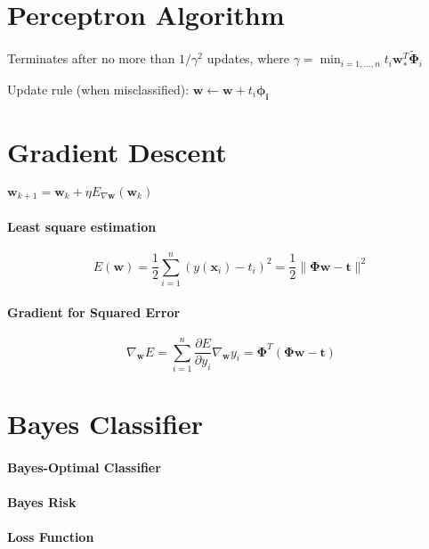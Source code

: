 \documentclass[9pt,fleqn]{scrartcl}
\begin{document}
\begin{multicols}{4}
\section{Perceptron Algorithm}
Terminates after no more than $1/\gamma^2$ updates, where 
$\gamma = \min_{i=1,\dots,n} t_i\mathbf{w}_*^T\mathbf{\tilde
\Phi}_i$

Update rule (when misclassified): $\mathbf{w} \leftarrow \mathbf{w} +
t_i\mathbf{\phi_i}$

\section{Gradient Descent}
$\mathbf{w}_{k+1} = \mathbf{w}_k + \eta E_{\nabla \mathbf w}(\mathbf{w}_k)$
\paragraph{Least square estimation}
\[ E(\mathbf w) = \frac12 \sum_{i=1}^n(y(\mathbf x_i)-t_i)^2= \frac12
\|\mathbf\Phi\mathbf w- \mathbf t\|^2 \]
\paragraph{Gradient for Squared Error}
\[ \nabla_{\mathbf w}E= \sum_{i=1}^n\frac{\partial E}{\partial y_i}
\nabla_{\mathbf w}y_i = \mathbf\Phi^T(\mathbf \Phi \mathbf w - \mathbf
t) \]

\section{Bayes Classifier}
\paragraph{Bayes-Optimal Classifier}
\paragraph{Bayes Risk}
\paragraph{Loss Function}

\end{multicols}
\end{document}
